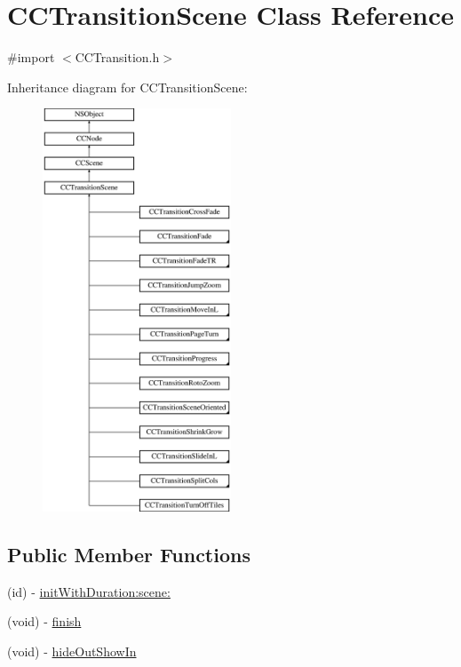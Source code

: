 \hypertarget{interface_c_c_transition_scene}{\section{C\-C\-Transition\-Scene Class Reference}
\label{interface_c_c_transition_scene}
}


{\ttfamily \#import $<$C\-C\-Transition.\-h$>$}

Inheritance diagram for C\-C\-Transition\-Scene\-:\begin{figure}[H]
\begin{center}
\leavevmode
\includegraphics[height=12.000000cm]{interface_c_c_transition_scene}
\end{center}
\end{figure}
\subsection*{Public Member Functions}
\begin{DoxyCompactItemize}
\item 
(id) -\/ \hyperlink{interface_c_c_transition_scene_aa94ef2134564a9d9634d1c3ca3ff6b54}{init\-With\-Duration\-:scene\-:}
\item 
(void) -\/ \hyperlink{interface_c_c_transition_scene_ac67df41af43ce2cf2c97511777045168}{finish}
\item 
(void) -\/ \hyperlink{interface_c_c_transition_scene_a6354ea8a37b54a01b461d561f855d112}{hide\-Out\-Show\-In}
\end{DoxyCompactItemize}
